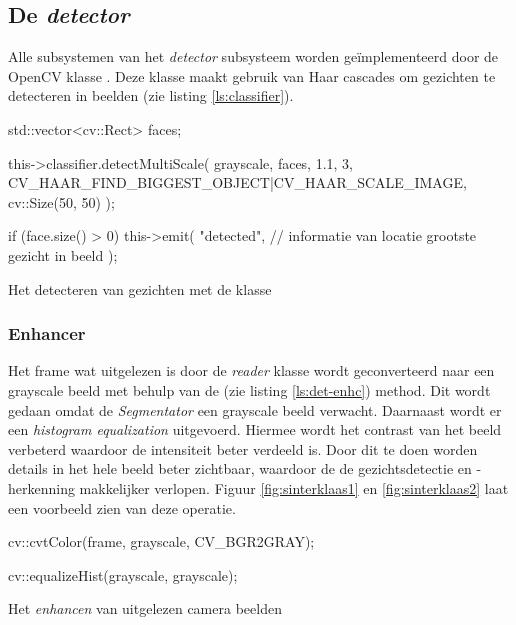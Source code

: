 \vfill
\pagebreak

\subsection{De \emph{detector}}

Alle subsystemen van het \emph{detector} subsysteem worden geïmplementeerd door
de OpenCV klasse . Deze klasse maakt gebruik van
Haar cascades om gezichten te detecteren in beelden (zie listing \ref{ls:classifier}).

\begin{listing}[H]
    \begin{cppcode}
    std::vector<cv::Rect> faces;

    this->classifier.detectMultiScale(
        grayscale,
        faces,
        1.1,
        3,
        CV_HAAR_FIND_BIGGEST_OBJECT|CV_HAAR_SCALE_IMAGE,
        cv::Size(50, 50)
    );

    if (face.size() > 0) {
        this->emit(
            "detected",
            // informatie van locatie grootste gezicht in beeld
        );
    }
    \end{cppcode}
    \caption{Het detecteren van gezichten met de  klasse}
    \label{ls:classifier}
\end{listing}

\subsubsection{Enhancer}

Het frame wat uitgelezen is door de \emph{reader} klasse wordt geconverteerd
naar een grayscale beeld met behulp van de  (zie listing \ref{ls:det-enhc})
method. Dit wordt gedaan omdat de \emph{Segmentator} een grayscale beeld verwacht.
Daarnaast wordt er een \emph{histogram equalization} uitgevoerd. Hiermee wordt
het contrast van het beeld verbeterd waardoor de intensiteit beter verdeeld is.
Door dit te doen worden details in het hele beeld beter zichtbaar, waardoor de
de gezichtsdetectie en -herkenning makkelijker verlopen. Figuur \ref{fig:sinterklaas1}
en \ref{fig:sinterklaas2} laat een voorbeeld zien van deze operatie.

\begin{listing}[H]
    \begin{cppcode}
    cv::cvtColor(frame, grayscale, CV_BGR2GRAY);

    cv::equalizeHist(grayscale, grayscale);
    \end{cppcode}
    \caption{Het \emph{enhancen} van uitgelezen camera beelden}
    \label{ls:det-enhc}
\end{listing}

